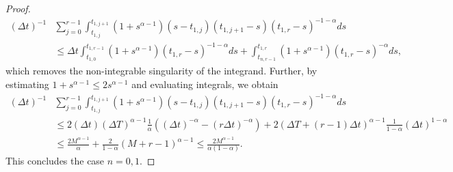 \documentclass[12pt,a4paper]{article}
\begin{document}
\begin{proof}
\begin{equation}
		\begin{split}
			(\Delta t)^{-1}&\sum_{j=0}^{r-1} \int_{t_{1,j}}^{t_{1,j+1}} (1+s^{\alpha-1})(s-t_{1,j})(t_{1,j+1}-s)(t_{1,r}-s)^{-1-\alpha} ds \\
			&\leq \Delta t \int_{t_{1,0}}^{t_{1,r-1}} (1+s^{\alpha-1}) (t_{1,r} - s)^{-1-\alpha} ds + \int_{t_{n,r-1}}^{t_{1,r}} (1+s^{\alpha-1}) (t_{1,r} - s)^{-\alpha} ds,
		\end{split}
	\end{equation}
	which removes the non-integrable singularity of the integrand. Further, by estimating $1+s^{\alpha-1}\leq 2 s^{\alpha-1}$ and evaluating integrals, we obtain
	\begin{equation}
		\begin{split}
			(\Delta t)^{-1}&\sum_{j=0}^{r-1} \int_{t_{1,j}}^{t_{1,j+1}} (1+s^{\alpha-1})(s-t_{1,j})(t_{1,j+1}-s)(t_{1,r}-s)^{-1-\alpha} ds \\
			&\leq 2(\Delta t) (\Delta T)^{\alpha-1} \frac{1}{\alpha} \left((\Delta t)^{-\alpha} - (r \Delta t)^{-\alpha}\right) + 2(\Delta T + (r-1) \Delta t)^{\alpha-1} \frac{1}{1-\alpha} (\Delta t)^{1-\alpha} \\
			&\leq \frac{2 M^{\alpha-1}}{\alpha} + \frac{2}{1-\alpha} (M+r-1)^{\alpha-1} \leq \frac{2 M^{\alpha-1}}{\alpha(1-\alpha)}. 
		\end{split}
	\end{equation}
	This concludes the case $n=0,1$.
	

\end{proof}
\end{document}
